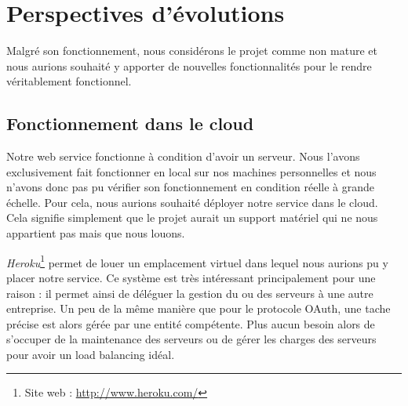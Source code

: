 
\section{Perspectives d'évolutions}

Malgré son fonctionnement, nous considérons le projet comme non mature et nous aurions souhaité y apporter de
nouvelles fonctionnalités pour le rendre véritablement fonctionnel.




\subsection{Fonctionnement dans le cloud}

Notre web service fonctionne à condition d'avoir un serveur. Nous l'avons exclusivement fait fonctionner en local
sur nos machines personnelles et nous n'avons donc pas pu vérifier son fonctionnement en condition réelle à grande
échelle. Pour cela, nous aurions souhaité déployer notre service dans le cloud. Cela signifie simplement que le 
projet aurait un support matériel qui ne nous appartient pas mais que nous louons. 

\textit{Heroku}\footnote{Site web : \href{http://www.heroku.com/}{http://www.heroku.com/}} permet de louer un emplacement virtuel 
dans lequel nous aurions pu y placer notre service. Ce système est très intéressant principalement pour une raison : il permet ainsi de déléguer la gestion du ou des serveurs à une autre entreprise. Un peu de la même manière que pour
le protocole OAuth, une tache précise est alors gérée par une entité compétente. Plus aucun besoin alors de s'occuper
de la maintenance des serveurs ou de gérer les charges des serveurs pour avoir un load balancing idéal.

